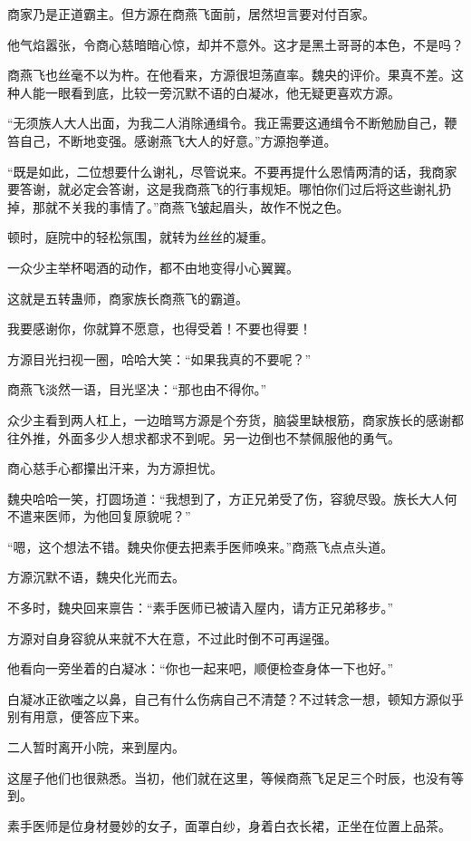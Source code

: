 \begin{this_body}
商家乃是正道霸主。但方源在商燕飞面前，居然坦言要对付百家。

他气焰嚣张，令商心慈暗暗心惊，却并不意外。这才是黑土哥哥的本色，不是吗？

商燕飞也丝毫不以为杵。在他看来，方源很坦荡直率。魏央的评价。果真不差。这种人能一眼看到底，比较一旁沉默不语的白凝冰，他无疑更喜欢方源。

“无须族人大人出面，为我二人消除通缉令。我正需要这通缉令不断勉励自己，鞭笞自己，不断地变强。感谢燕飞大人的好意。”方源抱拳道。

“既是如此，二位想要什么谢礼，尽管说来。不要再提什么恩情两清的话，我商家要答谢，就必定会答谢，这是我商燕飞的行事规矩。哪怕你们过后将这些谢礼扔掉，那就不关我的事情了。”商燕飞皱起眉头，故作不悦之色。

顿时，庭院中的轻松氛围，就转为丝丝的凝重。

一众少主举杯喝酒的动作，都不由地变得小心翼翼。

这就是五转蛊师，商家族长商燕飞的霸道。

我要感谢你，你就算不愿意，也得受着！不要也得要！

方源目光扫视一圈，哈哈大笑：“如果我真的不要呢？”

商燕飞淡然一语，目光坚决：“那也由不得你。”

众少主看到两人杠上，一边暗骂方源是个夯货，脑袋里缺根筋，商家族长的感谢都往外推，外面多少人想求都求不到呢。另一边倒也不禁佩服他的勇气。

商心慈手心都攥出汗来，为方源担忧。

魏央哈哈一笑，打圆场道：“我想到了，方正兄弟受了伤，容貌尽毁。族长大人何不遣来医师，为他回复原貌呢？”

“嗯，这个想法不错。魏央你便去把素手医师唤来。”商燕飞点点头道。

方源沉默不语，魏央化光而去。

不多时，魏央回来禀告：“素手医师已被请入屋内，请方正兄弟移步。”

方源对自身容貌从来就不大在意，不过此时倒不可再逞强。

他看向一旁坐着的白凝冰：“你也一起来吧，顺便检查身体一下也好。”

白凝冰正欲嗤之以鼻，自己有什么伤病自己不清楚？不过转念一想，顿知方源似乎别有用意，便答应下来。

二人暂时离开小院，来到屋内。

这屋子他们也很熟悉。当初，他们就在这里，等候商燕飞足足三个时辰，也没有等到。

素手医师是位身材曼妙的女子，面罩白纱，身着白衣长裙，正坐在位置上品茶。


\end{this_body}
